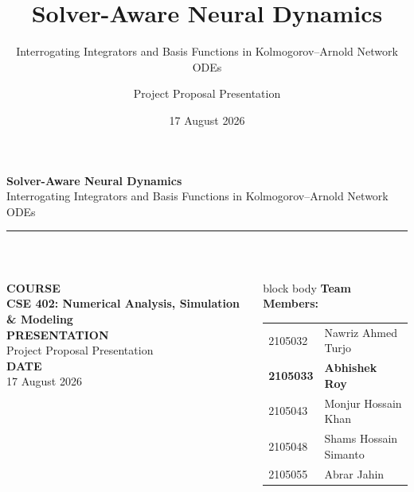 \documentclass[aspectratio=169,10pt]{beamer}
\title{Solver-Aware Neural Dynamics}
\subtitle{Interrogating Integrators and Basis Functions in Kolmogorov--Arnold Network ODEs}
\author{Project Proposal Presentation}
\institute{CSE 402: Numerical Analysis, Simulation \& Modeling}
\date{17 August 2026}
\begin{document}
\begin{frame}[plain]
  \vspace{0.8em}
  {\Large\bfseries\color{KanInk} Solver-Aware Neural Dynamics}\\[0.25em]
  {\small\color{KanInk} Interrogating Integrators and Basis Functions in Kolmogorov--Arnold Network ODEs}\\[0.4em]
  {\color{KanTeal}\rule{\textwidth}{1.2pt}}\\[0.8em]

  \begin{columns}[T,onlytextwidth]
      \vspace{0.3em}
      {\scriptsize\bfseries\color{KanSlate} COURSE}\\[0.15em]
      {\small\textbf{CSE 402: Numerical Analysis, Simulation \& Modeling}}\\[0.75em]

      {\scriptsize\bfseries\color{KanSlate} PRESENTATION}\\[0.15em]
      {\small Project Proposal Presentation}\\[0.75em]

      {\scriptsize\bfseries\color{KanSlate} DATE}\\[0.15em]
      {\small 17 August 2026}

      \begin{beamercolorbox}[rounded=true,sep=0.6em]{block body}
        {\footnotesize\bfseries\color{KanBlue} Team Members:}\\[0.45em]
        \footnotesize
        \begin{tabular}{@{}ll@{}}
            2105032 & Nawriz Ahmed Turjo \\[0.35em]
          \textbf{2105033} & \textbf{Abhishek Roy} \\[0.35em]
          2105043 & Monjur Hossain Khan \\[0.35em]
          2105048 & Shams Hossain Simanto \\[0.35em]
          2105055 & Abrar Jahin
        \end{tabular}
      \end{beamercolorbox}
  \end{columns}
\end{frame}
\end{document}
